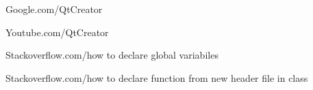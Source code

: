 \begin{thebibliography}{99999}
\singlespace\normalsize

 Google.com/QtCreator


 Youtube.com/QtCreator

 Stackoverflow.com/how to declare global variabiles

 Stackoverflow.com/how to declare function from new header file in class

\end{thebibliography}
